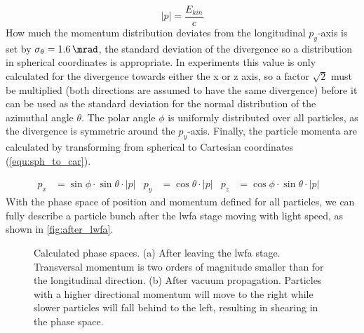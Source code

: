 \documentclass[bachelor_thesis]{subfiles}
\begin{document}
\begin{equation}
	\left|p\right|=\frac{E_{kin}}{c}
	\label{equ:E_to_mom}
\end{equation}
How much the momentum distribution deviates from the longitudinal $p_y$-axis is set by $\sigma_{\theta}=\qty{1.6}{\mrad}$, the standard deviation of the divergence  so a distribution in spherical coordinates is appropriate. 
In experiments this value is only calculated for the divergence towards either the x or z axis, so a factor $\sqrt{2}$ must be multiplied (both directions are assumed to have the same divergence) before 
it can be used as the standard deviation for the normal distribution of the azimuthal angle $\theta$. The polar angle $\phi$ is uniformly distributed over all particles, as the divergence is symmetric around the $p_y$-axis.
Finally, the particle momenta are calculated by transforming from spherical to Cartesian coordinates (\autoref{equ:sph_to_car}). 

\begin{align}
	p_x&=\sin{\phi} \cdot \sin{\theta} \cdot \left|p\right|	&
	p_y&=\cos{\theta} \cdot \left|p\right|				&
	p_z&=\cos{\phi} \cdot \sin{\theta} \cdot \left|p\right|	&
	\label{equ:sph_to_car}
\end{align}
With the phase space of position and momentum defined for all particles, we can fully describe a particle bunch after the \gls{lwfa} stage moving with light speed, as shown in \autoref{fig:after_lwfa}.

\begin{figure}
\begin{subfigure}{\textwidth}
	\missingfigure{}
	\label{fig:after_lwfa}
\end{subfigure}
\newline
\begin{subfigure}{\textwidth}
	\missingfigure{}
	\label{fig:after_vac}
\end{subfigure}
\caption{Calculated phase spaces. (a) After leaving the \gls{lwfa} stage. Transversal momentum is two orders of magnitude smaller than for the longitudinal direction. (b) After vacuum propagation. Particles with
a higher directional momentum will move to the right while slower particles will fall behind to the left, resulting in shearing in the phase space.}
\end{figure}
\end{document}
